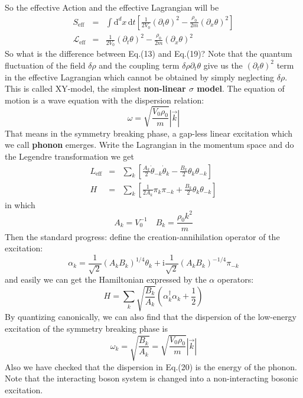 \documentclass{article}
\newcommand{\im}{\mathrm{i}}
\newcommand{\ud}{\mathrm{d}}
\begin{document}
So the effective Action and the effective Lagrangian will be
\begin{eqnarray}
S_{\mathrm{eff}}&=&\int \ud^dx\,\ud t \left[\frac{1}{2V_0}(\partial_t \theta)^2 - \frac{\rho_0}{2m}(\partial_x\theta)^2\right]\\
\mathcal{L}_{\mathrm{eff}} &=& \frac{1}{2V_0}(\partial_t \theta)^2 - \frac{\rho_0}{2m}(\partial_x\theta)^2
\end{eqnarray}
So what is the difference between Eq.(13) and Eq.(19)? Note that the quantum fluctuation of the field $\delta \rho$ and the coupling term $\delta\rho\partial_t\theta$ give us the $(\partial_t \theta)^2$ term in the effective Lagrangian which cannot be obtained by simply neglecting $\delta \rho$. This is called XY-model, the simplest {\bf{non-linear $\sigma$ model}}. The equation of motion is a wave equation with the dispersion relation:
\begin{equation}
\omega = \sqrt{\frac{V_0\rho_0}{m}}|\vec{k}|
\end{equation}
That means in the symmetry breaking phase, a gap-less linear excitation which we call {\bf{phonon}} emerges. Write the Lagrangian in the momentum space and do the Legendre transformation we get
\begin{eqnarray}
L_{\mathrm{eff}}& = &\sum_k \left[\frac{A_k}{2}\dot{\theta}_{-k}\dot{\theta}_k-\frac{B_k}{2}\theta_k\theta_{-k}\right]\\
H &=& \sum_k \left[\frac{1}{2A_k}\pi_k\pi_{-k}+\frac{B_k}{2}\theta_k\theta_{-k}\right]
\end{eqnarray}
in which
$$
A_k =V_0^{-1}\quad B_k = \frac{\rho_0k^2}{m}
$$
Then the standard progress: define the creation-annihilation operator of the excitation:
\begin{equation}
\alpha_k= \frac{1}{\sqrt{2}}(A_kB_k)^{1/4}\theta_k + \im \frac{1}{\sqrt{2}}(A_kB_k)^{-1/4}\pi_{-k}
\end{equation}
and easily we can get the Hamiltonian expressed by the $\alpha$ operators:
\begin{equation}
H = \sum_{k} \sqrt{\frac{B_k}{A_k}}\left(\alpha^\dagger_k \alpha_k +\frac{1}{2}\right)
\end{equation}
By quantizing canonically, we can also find that the dispersion of the low-energy excitation of the symmetry breaking phase is
$$
\omega_k = \sqrt{\frac{B_k}{A_k}} = \sqrt{\frac{V_0\rho_0}{m}}|\vec{k}|
$$
Also we have checked that the dispersion in Eq.(20) is the energy of the phonon. Note that the interacting boson system is changed into a non-interacting bosonic excitation. 
\end{document}
